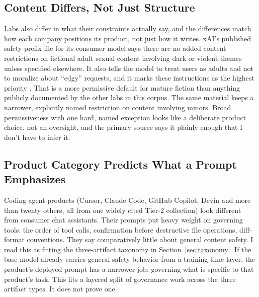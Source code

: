 \documentclass[11pt]{article}
\begin{document}
\subsection{Content Differs, Not Just Structure}
Labs also differ in what their constraints actually say, and the differences
match how each company positions its product, not just how it writes. xAI's
published safety-prefix file for its consumer model says there are no added
content restrictions on fictional adult sexual content involving dark or
violent themes unless specified elsewhere. It also tells the model to treat
users as adults and not to moralize about ``edgy'' requests, and it marks
these instructions as the highest priority \citep{xaigrokrepo2026}. That is a
more permissive default for mature fiction than anything publicly documented
by the other labs in this corpus. The same material keeps a narrower,
explicitly named restriction on content involving minors. Broad permissiveness
with one hard, named exception looks like a deliberate product choice, not an
oversight, and the primary source says it plainly enough that I don't have to
infer it.

\subsection{Product Category Predicts What a Prompt Emphasizes}
\label{sec:coding-agents}
Coding-agent products (Cursor, Claude Code, GitHub Copilot, Devin and more
than twenty others, all from one widely cited Tier-2 collection) look
different from consumer chat assistants. Their prompts put heavy weight on
governing tools: the order of tool calls, confirmation before destructive file
operations, diff-format conventions. They say comparatively little about
general content safety. I read this as fitting the three-artifact taxonomy in
Section~\ref{sec:taxonomy}. If the base model already carries general safety
behavior from a training-time layer, the product's deployed prompt has a
narrower job: governing what is specific to that product's task. This fits a
layered split of governance work across the three artifact types. It does not
prove one.
\end{document}
